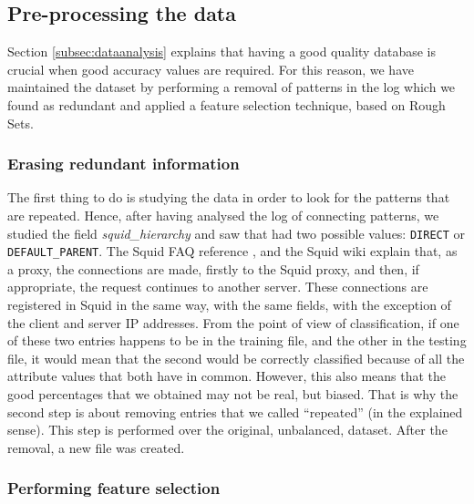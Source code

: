 \documentclass{llncs}
\begin{document}
%
\subsection{Pre-processing the data}
\label{subsec:preprocessing}

Section \ref{subsec:dataanalysis} explains that having a good quality database is crucial when good accuracy values are required. For this reason, we have maintained the dataset by performing a removal of patterns in the log which we found as redundant and applied a feature selection technique, based on Rough Sets.

%
\subsubsection{Erasing redundant information}
\label{subsec:duplicateddata}

The first thing to do is studying the data in order to look for the patterns that are repeated. Hence, after having analysed the log of connecting patterns, we studied the field \textit{squid\_hierarchy} and saw that had two possible values: \texttt{DIRECT} or \texttt{DEFAULT\_PARENT}. The Squid FAQ reference \cite{squid_logs}, and the Squid wiki \cite{squid_wiki} explain that, as a proxy, the connections are made, firstly to the Squid proxy, and then, if appropriate, the request continues to another server. These connections are registered in Squid in the same way, with the same fields, with the exception of the client and server IP addresses. From the point of view of classification, if one of these two entries happens to be in the training file, and the other in the testing file, it would mean that the second would be correctly classified because of all the attribute values that both have in common. However, this also means that the good percentages that we obtained may not be real, but biased. That is why the second step is about removing entries that we called ``repeated'' (in the explained sense). This step is performed over the original, unbalanced, dataset. After the removal, a new file was created.

%
\subsubsection{Performing feature selection}
\label{subsec:featselresults}
\end{document}
